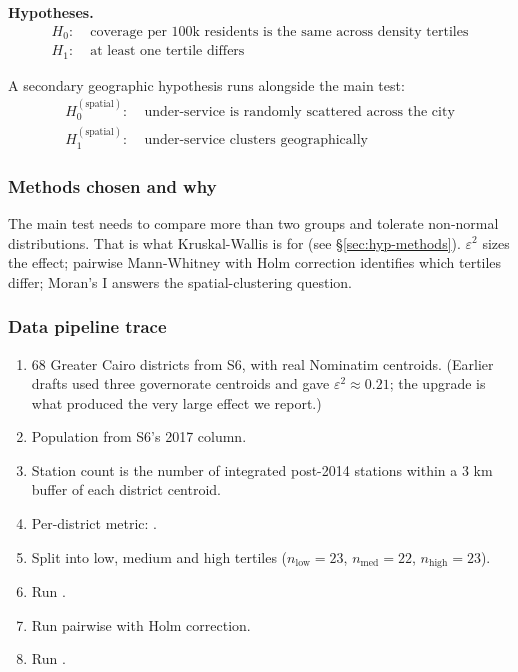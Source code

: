 \textbf{Hypotheses.}
\begin{align*}
  H_0:\;& \text{coverage per 100k residents is the same across density tertiles} \\
  H_1:\;& \text{at least one tertile differs}
\end{align*}

A secondary geographic hypothesis runs alongside the main test:
\begin{align*}
  H_0^{(\text{spatial})}:\;& \text{under-service is randomly scattered across the city} \\
  H_1^{(\text{spatial})}:\;& \text{under-service clusters geographically}
\end{align*}

\subsubsection{Methods chosen and why}

The main test needs to compare more than two groups and tolerate
non-normal distributions. That is what Kruskal-Wallis is for (see
\S\ref{sec:hyp-methods}). $\varepsilon^2$ sizes the effect; pairwise
Mann-Whitney with Holm correction identifies which tertiles differ;
Moran's I answers the spatial-clustering question.

\subsubsection{Data pipeline trace}

\begin{enumerate}
  \item 68 Greater Cairo districts from S6, with real Nominatim
        centroids. (Earlier drafts used three governorate centroids
        and gave $\varepsilon^2 \approx 0.21$; the upgrade is what
        produced the very large effect we report.)
  \item Population from S6's 2017 column.
  \item Station count is the number of integrated post-2014 stations
        within a 3 km buffer of each district centroid.
  \item Per-district metric: .
  \item Split into low, medium and high tertiles
        ($n_\text{low} = 23$, $n_\text{med} = 22$, $n_\text{high} = 23$).
  \item Run .
  \item Run pairwise  with Holm
        correction.
  \item Run .
\end{enumerate}

